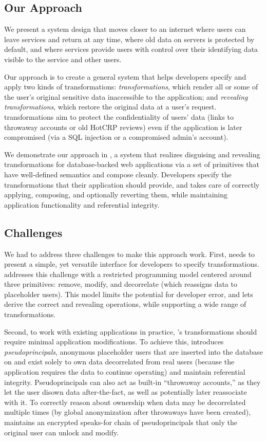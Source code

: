 \subsection{Our Approach}
%
We present a system design that moves closer to an
internet where users can leave services and return at any time, where old data
on servers is protected by default, and where services provide users with
control over their identifying data visible to the service and other users.

%
Our approach is to create a general system that helps developers specify and apply
two kinds of transformations: \emph{\xxing transformations}, which render all or
some of the user’s original sensitive data inaccessible to the application; and
\emph{revealing transformations}, which restore the original data at a user’s
request.
%
\Xxing transformations aim to protect the confidentiality of users' \xxed
data (\eg links to throwaway accounts or old HotCRP reviews) even if the
application is later compromised (\eg via a SQL injection or a compromised
admin's account).
%

%
We demonstrate our approach in \sys, a system that realizes disguising and
revealing transformations for
database-backed web applications via a set of primitives that have well-defined
semantics and compose cleanly.
%
Developers specify the transformations that their application should provide,
and \sys takes care of correctly applying, composing, and optionally reverting
them, while maintaining application functionality and referential integrity.
%

%
\subsection{Challenges}
%
We had to address three challenges to make this approach work.
%
First, \sys needs to present a simple, yet versatile interface for developers to
specify \xxing transformations.
%
\sys addresses this challenge with a restricted programming model centered
around three primitives: remove, modify, and decorrelate (which reassigns data
to placeholder users).
%
This model limits the potential for developer error, and lets \sys derive the
correct \xxing and revealing operations, while supporting a wide range of
transformations.
%

%
Second, to work with existing applications in practice, \sys's \xxing
transformations should require minimal application modifications.
%
To achieve this, \sys introduces \emph{pseudoprincipals}, anonymous placeholder
users that are inserted into the database on \xxing and exist solely to own data
decorrelated from real users (\eg because the application requires the
data to continue operating) and maintain referential integrity.
%
Pseudoprincipals can also act as built-in ``throwaway accounts,'' as they let the
user disown data after-the-fact, as well as potentially later reassociate with it.
%
To correctly reason about ownership when data may be decorrelated multiple times
(\eg by global anonymization after throwaways have been created), \sys
maintains an encrypted speaks-for chain of pseudoprincipals that only the
original user can unlock and modify.
%


